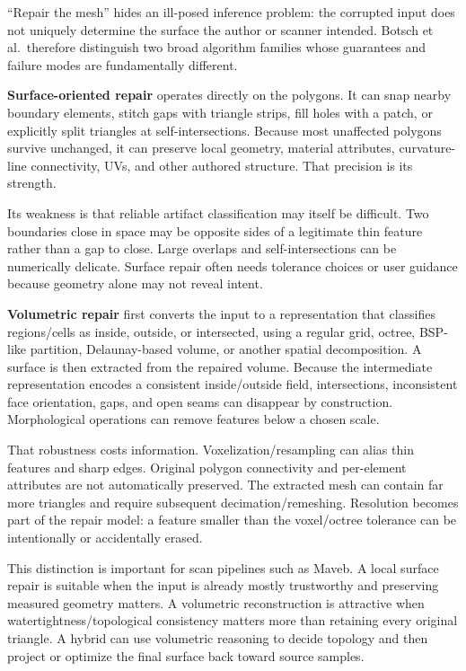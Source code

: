 ``Repair the mesh'' hides an ill-posed inference problem: the corrupted input does not uniquely determine the surface the author or scanner intended. Botsch et al.~therefore distinguish two broad algorithm families whose guarantees and failure modes are fundamentally different.

\textbf{Surface-oriented repair} operates directly on the polygons. It can snap nearby boundary elements, stitch gaps with triangle strips, fill holes with a patch, or explicitly split triangles at self-intersections. Because most unaffected polygons survive unchanged, it can preserve local geometry, material attributes, curvature-line connectivity, UVs, and other authored structure. That precision is its strength.

Its weakness is that reliable artifact classification may itself be difficult. Two boundaries close in space may be opposite sides of a legitimate thin feature rather than a gap to close. Large overlaps and self-intersections can be numerically delicate. Surface repair often needs tolerance choices or user guidance because geometry alone may not reveal intent.

\textbf{Volumetric repair} first converts the input to a representation that classifies regions/cells as inside, outside, or intersected, using a regular grid, octree, BSP-like partition, Delaunay-based volume, or another spatial decomposition. A surface is then extracted from the repaired volume. Because the intermediate representation encodes a consistent inside/outside field, intersections, inconsistent face orientation, gaps, and open seams can disappear by construction. Morphological operations can remove features below a chosen scale.

That robustness costs information. Voxelization/resampling can alias thin features and sharp edges. Original polygon connectivity and per-element attributes are not automatically preserved. The extracted mesh can contain far more triangles and require subsequent decimation/remeshing. Resolution becomes part of the repair model: a feature smaller than the voxel/octree tolerance can be intentionally or accidentally erased.

This distinction is important for scan pipelines such as Maveb. A local surface repair is suitable when the input is already mostly trustworthy and preserving measured geometry matters. A volumetric reconstruction is attractive when watertightness/topological consistency matters more than retaining every original triangle. A hybrid can use volumetric reasoning to decide topology and then project or optimize the final surface back toward source samples.

